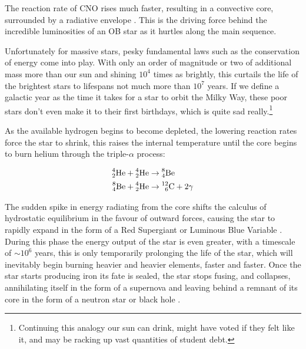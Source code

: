 The reaction rate of CNO rises much faster, resulting in a convective core, surrounded by a radiative envelope \parencite{salarisEvolutionStarsStellar2005}. This is the driving force behind the incredible luminosities of an OB star as it hurtles along the main sequence.





Unfortunately for massive stars, pesky fundamental laws such as the conservation of energy come into play. With only an order of magnitude or two of additional mass more than our sun and shining $10^4$ times as brightly, this curtails the life of the brightest stars to lifespans not much more than $10^7$ years.
If we define a galactic year as the time it takes for a star to orbit the Milky Way, these poor stars don't even make it to their first birthdays, which is quite sad really.\footnote{Continuing this analogy our sun can drink, might have voted if they felt like it, and may be racking up vast quantities of student debt.}


As the available hydrogen begins to become depleted, the lowering reaction rates force the star to shrink, this raises the internal temperature until the core begins to burn helium through the triple-$\alpha$ process:

\begin{subequations}
  \begin{align*}
    \prescript{4}{2}{\text{He}} + \prescript{4}{2}{\text{He}} & \rightarrow \prescript{8}{4}{\text{Be}} \\
    \prescript{8}{4}{\text{Be}} + \prescript{4}{2}{\text{He}} & \rightarrow \prescript{12}{6}{\text{C}} + 2\gamma
  \end{align*}
\end{subequations}

The sudden spike in energy radiating from the core shifts the calculus of hydrostatic equilibrium in the favour of outward forces, causing the star to rapidly expand in the form of a Red Supergiant or Luminous Blue Variable \parencite{ryanStellarEvolutionNucleosynthesis2010a}.
During this phase the energy output of the star is even greater, with a timescale of $\sim 10^6$ years, this is only temporarily prolonging the life of the star, which will inevitably begin burning heavier and heavier elements, faster and faster.
Once the star starts producing iron its fate is sealed, the star stops fusing, and collapses, annihilating itself in the form of a supernova and leaving behind a remnant of its core in the form of a neutron star or black hole 
\parencite{ward-thompsonIntroductionStarFormation2011}.

